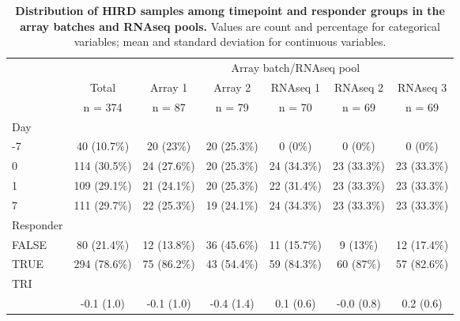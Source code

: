 \begin{table}[] 
 \centering 
 \caption[]{\textbf{Distribution of \gls{HIRD} samples among timepoint and responder groups in the array batches and \gls{RNAseq} pools.} Values are count and percentage for categorical variables; mean and standard deviation for continuous variables.}\label{tab:hird_batch_balance}
 \begin{tabular}{ l c c c c c c }
 \toprule
  &   &  \multicolumn{ 5 }{c}{ Array batch/\gls{RNAseq} pool }\\ 
  & Total & Array 1 & Array 2 & \gls{RNAseq} 1 & \gls{RNAseq} 2 & \gls{RNAseq} 3\\ 
  & n = 374 & n = 87 & n = 79 & n = 70 & n = 69 & n = 69 \\ 
  \midrule
 Day &   &   &   &   &   &  \\ 
 \hspace{6pt}    -7 & 40 (10.7\%) & 20 (23\%) & 20 (25.3\%) & 0 (0\%) & 0 (0\%) & 0 (0\%)\\ 
 \hspace{6pt}    0 & 114 (30.5\%) & 24 (27.6\%) & 20 (25.3\%) & 24 (34.3\%) & 23 (33.3\%) & 23 (33.3\%)\\ 
 \hspace{6pt}    1 & 109 (29.1\%) & 21 (24.1\%) & 20 (25.3\%) & 22 (31.4\%) & 23 (33.3\%) & 23 (33.3\%)\\ 
 \hspace{6pt}    7 & 111 (29.7\%) & 22 (25.3\%) & 19 (24.1\%) & 24 (34.3\%) & 23 (33.3\%) & 23 (33.3\%)\\ 
 Responder &   &   &   &   &   &  \\ 
 \hspace{6pt}    FALSE & 80 (21.4\%) & 12 (13.8\%) & 36 (45.6\%) & 11 (15.7\%) & 9 (13\%) & 12 (17.4\%)\\ 
 \hspace{6pt}    TRUE & 294 (78.6\%) & 75 (86.2\%) & 43 (54.4\%) & 59 (84.3\%) & 60 (87\%) & 57 (82.6\%)\\ 
 TRI &   &   &   &   &   &  \\ 
 \hspace{6pt}   & -0.1 (1.0) & -0.1 (1.0) & -0.4 (1.4) & 0.1 (0.6) & -0.0 (0.8) & 0.2 (0.6)\\ 
 \bottomrule
 
 \end{tabular}
 \end{table}
